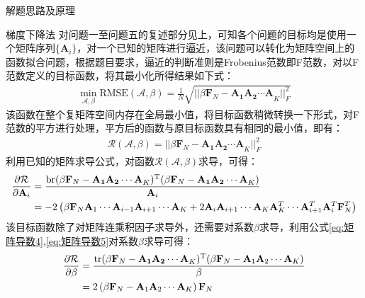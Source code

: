 \documentclass[11pt]{article}
\begin{document}
\begin{section}{解题思路及原理}
 \begin{subsection}{梯度下降法}
   对问题一至问题五的复述部分见上，可知各个问题的目标均是使用一个矩阵序列$\{\mathbf{A}_i\}$，对一个已知的矩阵进行逼近，该问题可以转化为矩阵空间上的函数拟合问题，根据题目要求，逼近的判断准则是Frobenius范数即F范数，对以F范数定义的目标函数，将其最小化所得结果如下式：
   \begin{align}
     \min\limits_{\mathcal{A},\beta} \mathrm{RMSE}(\mathcal{A},\beta)=\frac{1}{N}\sqrt{||\beta\mathbf{F}_N-\mathbf{A_1A_2\cdots A}_K||_F^2}\label{eq:目标函数}
   \end{align}
   该函数在整个复矩阵空间内存在全局最小值，将目标函数稍微转换一下形式，对F范数的平方进行处理，平方后的函数与原目标函数具有相同的最小值，即有：
   \begin{align}
     \mathcal{R}(\mathcal{A},\beta)=||\beta\mathbf{F}_N-\mathbf{A_1A_2\cdots A}_K||_F^2
   \end{align}
   利用已知的矩阵求导公式，对函数$\mathcal{R}(\mathcal{A},\beta)$求导，可得：
   \begin{equation}
     \begin{aligned}
       \frac{\partial{\mathcal{R}}}{\partial{\mathbf{A}_i}} & =\frac{\mathrm{br}(\beta\mathbf{F}_N-\mathbf{A_1A_2\cdots A}_K)^\mathrm{T}(\beta\mathbf{F}_N-\mathbf{A_1A_2\cdots A}_K)}{\mathbf{A}_i}                                                                                         \\
                                         & =-2\left(\beta\mathbf{F}_N\mathbf{A}_1\cdots\mathbf{A}_{i-1}\mathbf{A}_{i+1}\cdots\mathbf{A}_K+2\mathbf{A}_i\mathbf{A}_{i+1}\cdots\mathbf{A}_K\mathbf{A}_K^T\cdots\mathbf{A}_{i+1}^T\mathbf{A}_i^T\mathbf{F}_N^T\right)
     \end{aligned}
     \label{eq:目标函数求导A}
   \end{equation}
   该目标函数除了对矩阵连乘积因子求导外，还需要对系数$\beta$求导，利用公式\ref{eq:矩阵导数4},\ref{eq:矩阵导数5}对系数$\beta$求导可得：
   \begin{equation}
     \begin{aligned}
       \pdiff{\mathcal{R}}{\beta} & =\frac{\mathrm{tr}(\beta\mathbf{F}_N-\mathbf{A_1A_2\cdots A}_K)\T(\beta\mathbf{F}_N-\mathbf{A}_1\mathbf{A}_2\cdots \mathbf{A}_K)}{\beta} \\
                                  & =2\circbrac{\beta\mathbf{F}_N-\mathbf{A}_1\mathbf{A}_2\cdots \mathbf{A}_K}\mathbf{F}_N
     \end{aligned}
     \label{eq:目标函数求导beta}

\end{equation}
\end{subsection}
\end{section}
\end{document}
